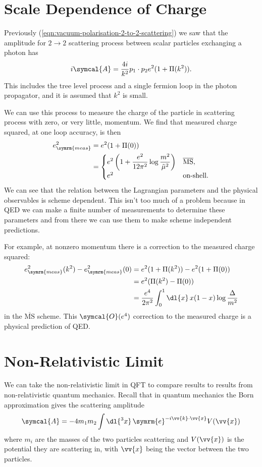\documentclass[fleqn]{NotesClass}
\newcommand{\MSbar}{\ensuremath{\overline{\text{MS}}}}
\newcommand{\e}{\symrm{e}}
\newcommand{\amplitude}{\symcal{A}}
\newcommand{\order}{\symcal{O}}
\newcommand{\measured}{\symrm{meas}}
\begin{document}
    \section{Scale Dependence of Charge}
    Previously (\cref{eqn:vacuum-polarisation-2-to-2-scattering}) we saw that the amplitude for \(2 \to 2\) scattering process between scalar particles exchanging a photon has
    \begin{equation}
        i\amplitude = \frac{4i}{k^2} p_1 \cdot p_2 e^2(1 + \Pi(k^2)).
    \end{equation}
    This includes the tree level process and a single fermion loop in the photon propagator, and it is assumed that \(k^2\) is small.
    
    We can use this process to measure the charge of the particle in scattering process with zero, or very little, momentum.
    We find that measured charge squared, at one loop accuracy, is then
    \begin{align}
        e_{\measured}^2 &= e^2(1 + \Pi(0))\\
        &= 
        \begin{cases}
            \displaystyle e^2\left( 1 + \frac{e^2}{12\pi^2} \log \frac{m^2}{\tilde{\mu}^2} \right) & \MSbar,\\
            e^2 & \text{on-shell}.
        \end{cases}
    \end{align}
    We can see that the relation between the Lagrangian parameters and the physical observables is scheme dependent.
    This isn't too much of a problem because in QED we can make a finite number of measurements to determine these parameters and from there we can use them to make scheme independent predictions.
    
    For example, at nonzero momentum there is a correction to the measured charge squared:
    \begin{align}
        e_{\measured}^2(k^2) - e_{\measured}^2(0) &= e^2(1 + \Pi(k^2)) - e^2(1 + \Pi(0))\\
        &= e^2(\Pi(k^2) - \Pi(0))\\
        &= \frac{e^4}{2\pi^2} \int_0^1 \dl{x} \, x(1 - x) \log \frac{\Delta}{m^2}
    \end{align}
    in the \MSbar{} scheme.
    This \(\order(e^4)\) correction to the measured charge is a physical prediction of QED.
    
    \section{Non-Relativistic Limit}
    We can take the non-relativistic limit in QFT to compare results to results from non-relativistic quantum mechanics.
    Recall that in quantum mechanics the Born approximation gives the scattering amplitude
    \begin{equation}
        \amplitude = -4m_1m_2 \int \dl{^3x} \, \e^{-i\vv{k} \cdot \vv{x}} V(\vv{x})
    \end{equation}
    where \(m_i\) are the masses of the two particles scattering and \(V(\vv{x})\) is the potential they are scattering in, with \(\vv{x}\) being the vector between the two particles.
    
\end{document}
